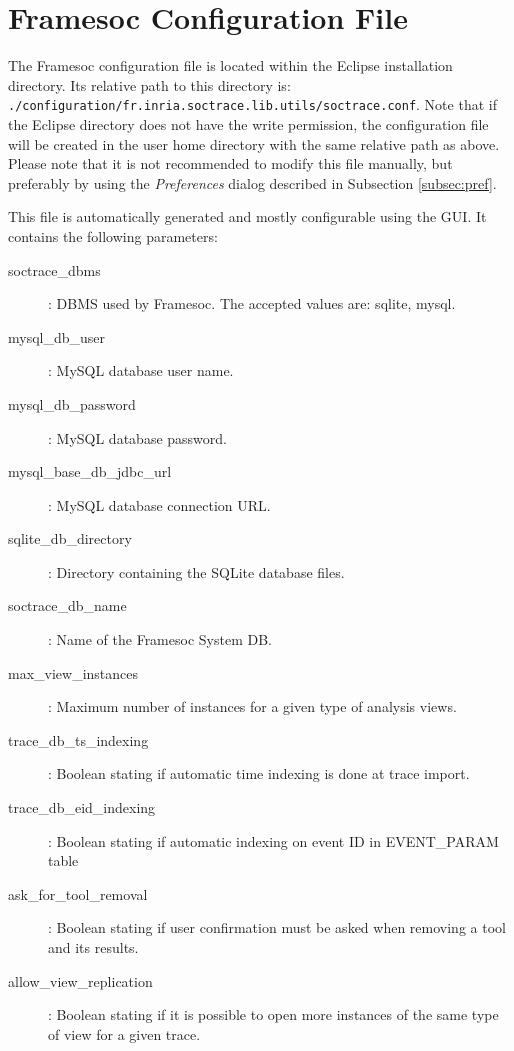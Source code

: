 \documentclass[twoside]{article}
\begin{document}
\begin{sloppypar}
\appendix

\section{Framesoc Configuration File}
\label{app:conf}

The Framesoc configuration file is located within the Eclipse installation directory.
Its relative path to this directory is:  \texttt{./configuration/fr.inria.soctrace.lib.utils/soctrace.conf}. Note that if the Eclipse directory does not have the write permission, the configuration file will be created in the user home directory with the same relative path as above. Please note that it is not recommended to modify this file manually, but preferably by using the \textit{Preferences} dialog described in Subsection \ref{subsec:pref}. 

This file is automatically generated and mostly configurable using the GUI. 
It contains the following parameters:
\begin{description}
 \item[soctrace\_dbms]: DBMS used by Framesoc. The accepted values are: sqlite, mysql.
 \item[mysql\_db\_user]: MySQL database user name.
 \item[mysql\_db\_password]: MySQL database password.
 \item[mysql\_base\_db\_jdbc\_url]: MySQL database connection URL.
 \item[sqlite\_db\_directory]: Directory containing the SQLite database files.
 \item[soctrace\_db\_name]: Name of the Framesoc System DB.
 \item[max\_view\_instances]: Maximum number of instances for a given type of analysis views.
 \item[trace\_db\_ts\_indexing]: Boolean stating if automatic time indexing is done at trace import.
 \item[trace\_db\_eid\_indexing]: Boolean stating if automatic indexing on event ID in EVENT\_PARAM table 
 \item[ask\_for\_tool\_removal]: Boolean stating if user confirmation must be asked when removing a tool and its results.
 \item[allow\_view\_replication]: Boolean stating if it is possible to open more instances of the same type of view for a given trace.

\end{description}

\newpage
\renewcommand{\refname}{References}
{}


\end{sloppypar} 
\end{document}
